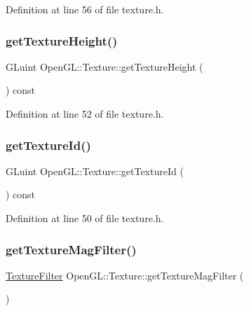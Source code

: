 Definition at line 56 of file texture.\+h.

\mbox{\label{class_open_g_l_1_1_texture_ae593a5c033d3fc0c801d64771b4bc0fe}} 
\subsubsection{\texorpdfstring{getTextureHeight()}{getTextureHeight()}}
{\footnotesize\ttfamily G\+Luint Open\+G\+L\+::\+Texture\+::get\+Texture\+Height (\begin{DoxyParamCaption}{ }\end{DoxyParamCaption}) const\hspace{0.3cm}{\ttfamily [inline]}}



Definition at line 52 of file texture.\+h.

\mbox{\label{class_open_g_l_1_1_texture_a23a849a67d8608d3af93b969ab6320c7}} 
\subsubsection{\texorpdfstring{getTextureId()}{getTextureId()}}
{\footnotesize\ttfamily G\+Luint Open\+G\+L\+::\+Texture\+::get\+Texture\+Id (\begin{DoxyParamCaption}{ }\end{DoxyParamCaption}) const\hspace{0.3cm}{\ttfamily [inline]}}



Definition at line 50 of file texture.\+h.

\mbox{\label{class_open_g_l_1_1_texture_a4624594b4d85149bedcf7f906802c3d7}} 
\subsubsection{\texorpdfstring{getTextureMagFilter()}{getTextureMagFilter()}}
{\footnotesize\ttfamily \mbox{\hyperlink{namespace_open_g_l_a34bc5965567ca64f43e5e38e7cfdb2e4}{Texture\+Filter}} Open\+G\+L\+::\+Texture\+::get\+Texture\+Mag\+Filter (\begin{DoxyParamCaption}{ }\end{DoxyParamCaption})\hspace{0.3cm}{\ttfamily [inline]}}



